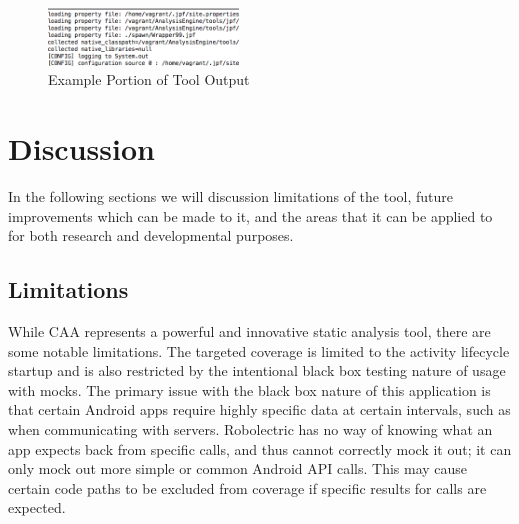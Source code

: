 \documentclass{sig-alternate-05-2015}
\begin{document}
\begin{figure}[ht!]
\centering
\includegraphics[width=0.45\textwidth]{images/output_small_smaller.png}
\caption{Example Portion of Tool Output}
\label{fig:concolic_output_portion}
\end{figure}




\section{Discussion}
\label{sec: discussion}

In the following sections we will discussion limitations of the tool, future improvements which can be made to it, and the areas that it can be applied to for both research and developmental purposes.

\subsection{Limitations}

While CAA represents a powerful and innovative static analysis tool, there are some notable limitations. The targeted coverage is limited to the activity lifecycle startup and is also restricted by the intentional black box testing nature of usage with mocks. The primary issue with the black box nature of this application is that certain Android apps require highly specific data at certain intervals, such as when communicating with servers. Robolectric has no way of knowing what an app expects back from specific calls, and thus cannot correctly mock it out; it can only mock out more simple or common Android API calls. This may cause certain code paths to be excluded from coverage if specific results for calls are expected.

\end{document}

